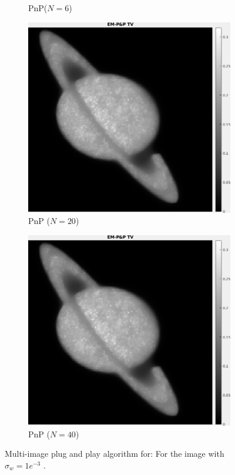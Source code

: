 \documentclass[a4paper, 11pt]{article}
\begin{document}
\begin{figure}[h]
\begin{subfigure}[b]{0.22\textwidth}
        \caption{PnP($N=6$)}
        \label{fig:PnP-1}
    \end{subfigure}
    \begin{subfigure}[b]{0.22\textwidth}
        \includegraphics[width=\textwidth]{../Figures/PnPReconstructionNoiseSigma1e-3Realization20.png}
        \caption{PnP ($N=20$)}
        \label{fig:PnP0}
    \end{subfigure}
    \begin{subfigure}[b]{0.22\textwidth}
        \includegraphics[width=\textwidth]{../Figures/PnPReconstructionNoiseSigma1e-3Realization20.png}
        \caption{PnP ($N=40$)}
        \label{fig:PnP1}
    \end{subfigure}
\caption{Multi-image plug and play algorithm for: For the image with $\sigma_w=1e^{-3}$  .}
\label{fig:inversionModel}
\end{figure}
\end{document}
